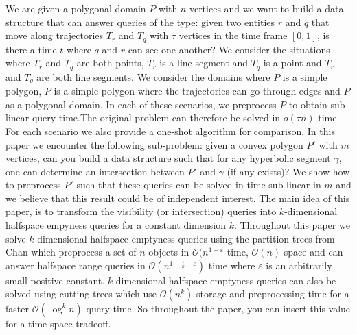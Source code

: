 \documentclass[a4paper, UKenglish]{paper}
\begin{document}
We are given a polygonal domain $P$ with $n$ vertices and we want to build a data structure that can answer queries of the type: given two entities $r$ and $q$ that move along trajectories $T_r$ and $T_q$ with $\tau$ vertices in the time frame $[0,1]$,  is there a time $t$ where $q$ and $r$ can see one another? We consider the situations where $T_r$ and $T_q$ are both points, $T_r$ is a line segment and $T_q$ is a point and $T_r$ and $T_q$ are both line segments. We consider the domains where $P$ is a simple polygon, $P$ is a simple polygon where the trajectories can go through edges and $P$ as a polygonal domain. In each of these scenarios, we preprocess $P$ to obtain sub-linear query time.The original problem can therefore be solved in $o(\tau n)$ time.  For each scenario we also provide a one-shot algorithm for comparison. In this paper we encounter the following sub-problem: given a convex polygon $P'$ with $m$ vertices, can you build a data structure such that for any hyperbolic segment $\gamma$, one can determine an intersection between $P'$ and $\gamma$ (if any exists)? We show how to preprocess $P'$ such that these queries can be solved in time sub-linear in $m$ and we believe that this result could be of independent interest. The main idea of this paper, is to transform the visibility (or intersection) queries into $k$-dimensional halfspace empyness queries for a constant dimension $k$. Throughout this paper we solve $k$-dimensional halfspace emptyness queries using the partition trees from Chan \cite{chan2012optimal} which preprocess a set of $n$ objects in $\mathcal{O}(n^{1+ \varepsilon}$ time, $\mathcal{O}(n)$ space and can answer halfspace range queries in $\mathcal{O}(n^{1 - \frac{1}{k} + \varepsilon})$ time where $\varepsilon$ is an arbitrarily small positive constant. $k$-dimensional halfspace emptyness queries can also be solved using cutting trees which use $\mathcal{O}(n^{k})$ storage and preprocessing time for a faster $\mathcal{O}(\log^k n)$ query time. So throughout the paper, you can insert this value for a time-space tradeoff.
\end{document}
